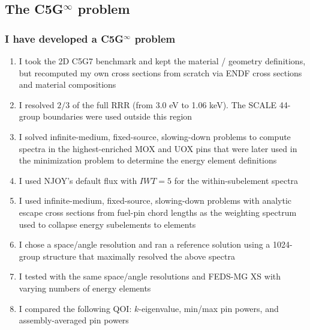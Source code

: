 \documentclass[compress,10pt]{beamer}
\begin{document}
\subsection{The C5G$^\infty$ problem}

\typeout{***********************************************************************************}

\begin{frame}
    \frametitle{I have developed a C5G$^\infty$ problem}

    \centering
    \begin{block}{}
        \begin{enumerate}
            \item<1-> I took the 2D C5G7 benchmark and kept the material / geometry definitions, but recomputed my own cross sections from scratch via ENDF cross sections and material compositions
            \item<2-> I resolved $2/3$ of the full RRR (from 3.0 eV to 1.06 keV). The SCALE 44-group boundaries were used outside this region
            \item<3-> I solved infinite-medium, fixed-source, slowing-down problems to compute spectra in the highest-enriched MOX and UOX pins that were later used in the minimization problem to determine the energy element definitions
            \item<4-> I used NJOY's default flux with $IWT=5$ for the within-subelement spectra
            \item<5-> I used infinite-medium, fixed-source, slowing-down problems with analytic escape cross sections from fuel-pin chord lengths as the weighting spectrum used to collapse energy subelements to elements
            \item<6-> I chose a space/angle resolution and ran a reference solution using a 1024-group structure that maximally resolved the above spectra
            \item<7-> I tested with the same space/angle resolutions and FEDS-MG XS with varying numbers of energy elements
            \item<8-> I compared the following QOI: $k$-eigenvalue, min/max pin powers, and assembly-averaged pin powers
        \end{enumerate}
    \end{block}
\end{frame}
\end{document}
